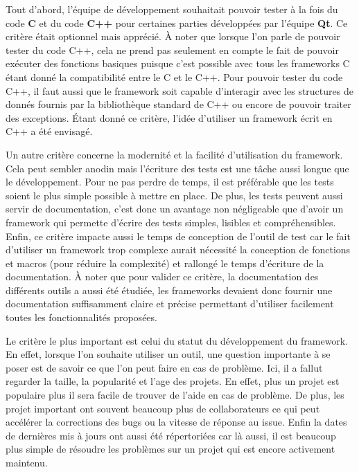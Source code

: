 \documentclass[a4paper]{article}
\begin{document}
Tout d'abord, l'équipe de développement souhaitait pouvoir tester à la fois du
code \textbf{C} et du code \textbf{C++} pour certaines parties développées par
l'équipe \textbf{Qt}. Ce critère était optionnel mais apprécié. À noter que
lorsque l'on parle de pouvoir tester du code C++, cela ne prend pas seulement en
compte le fait de pouvoir exécuter des fonctions basiques puisque c'est possible
avec tous les frameworks C étant donné la compatibilité entre le C et le C++.
Pour pouvoir tester du code C++, il faut aussi que le framework soit capable
d'interagir avec les structures de donnés fournis par la bibliothèque standard
de C++ ou encore de pouvoir traiter des exceptions. Étant donné ce critère,
l'idée d'utiliser un framework écrit en C++ a été envisagé.

Un autre critère concerne la modernité et la facilité d'utilisation du
framework. Cela peut sembler anodin mais l'écriture des tests est une tâche
aussi longue que le développement. Pour ne pas perdre de temps, il est
préférable que les tests soient le plus simple possible à mettre en place. De
plus, les tests peuvent aussi servir de documentation, c'est donc un avantage
non négligeable que d'avoir un framework qui permette d'écrire des tests
simples, lisibles et compréhensibles. Enfin, ce critère impacte aussi le temps
de conception de l'outil de test car le fait d'utiliser un framework trop
complexe aurait nécessité la conception de fonctions et macros (pour réduire la
complexité) et rallongé le temps d'écriture de la documentation. À noter que
pour valider ce critère, la documentation des différents outils a aussi été
étudiée, les frameworks devaient donc fournir une documentation suffisamment
claire et précise permettant d'utiliser facilement toutes les fonctionnalités
proposées.

Le critère le plus important est celui du statut du développement du framework.
En effet, lorsque l'on souhaite utiliser un outil, une question importante à se
poser est de savoir ce que l'on peut faire en cas de problème. Ici, il a fallut
regarder la taille, la popularité et l'age des projets. En effet, plus un projet
est populaire plus il sera facile de trouver de l'aide en cas de problème. De
plus, les projet important ont souvent beaucoup plus de collaborateurs ce qui
peut accélérer la corrections des bugs ou la vitesse de réponse au issue. Enfin
la dates de dernières mis à jours ont aussi été répertoriées car là aussi, il
est beaucoup plus simple de résoudre les problèmes sur un projet qui est encore
activement maintenu.
\end{document}
